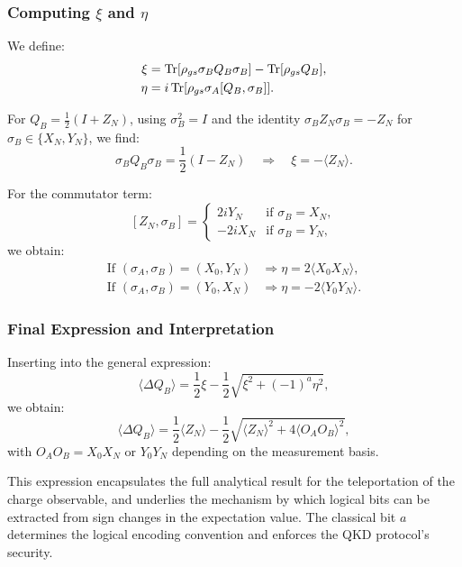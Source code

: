 \subsubsection{Computing \texorpdfstring{$\xi$}{xi} and \texorpdfstring{$\eta$}{eta}}

We define:
\begin{align}
\xi &= \Tr[\rho_{gs} \sigma_B Q_B \sigma_B] - \Tr[\rho_{gs} Q_B], \\
\eta &= i \Tr[\rho_{gs} \sigma_A [Q_B, \sigma_B]].
\end{align}

For \( Q_B = \frac{1}{2}(I + Z_N) \), using \( \sigma_B^2 = I \) and the identity \( \sigma_B Z_N \sigma_B = -Z_N \) for \( \sigma_B \in \{X_N, Y_N\} \), we find:
\begin{equation}
\sigma_B Q_B \sigma_B = \frac{1}{2}(I - Z_N) \quad \Rightarrow \quad \xi = -\langle Z_N \rangle.
\end{equation}

For the commutator term:
\[
[Z_N, \sigma_B] =
\begin{cases}
2i Y_N & \text{if } \sigma_B = X_N, \\
-2i X_N & \text{if } \sigma_B = Y_N,
\end{cases}
\]
we obtain:
\begin{align}
\text{If } (\sigma_A, \sigma_B) = (X_0, Y_N) &\Rightarrow \eta = 2 \langle X_0 X_N \rangle, \\
\text{If } (\sigma_A, \sigma_B) = (Y_0, X_N) &\Rightarrow \eta = -2 \langle Y_0 Y_N \rangle.
\end{align}

\subsubsection{Final Expression and Interpretation}

Inserting into the general expression:
\begin{equation}
\langle \Delta Q_B \rangle = \frac{1}{2} \xi - \frac{1}{2} \sqrt{\xi^2 + (-1)^a \eta^2},
\end{equation}
we obtain:
\begin{equation}
\langle \Delta Q_B \rangle = \frac{1}{2} \langle Z_N \rangle - \frac{1}{2} \sqrt{ \langle Z_N \rangle^2 + 4 \langle O_A O_B \rangle^2 },
\end{equation}
with \( O_A O_B = X_0 X_N \) or \( Y_0 Y_N \) depending on the measurement basis.

This expression encapsulates the full analytical result for the teleportation of the charge observable, and underlies the mechanism by which logical bits can be extracted from sign changes in the expectation value. The classical bit $a$ determines the logical encoding convention and enforces the QKD protocol’s security.
